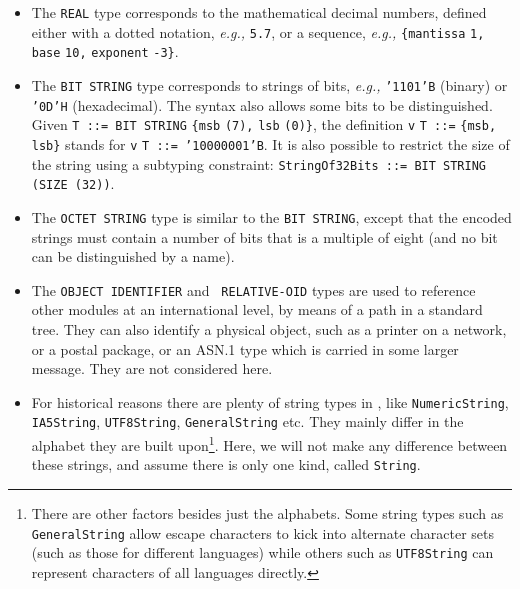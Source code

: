 \begin{itemize}
  \item The \texttt{\small REAL} type corresponds to the mathematical
        decimal numbers, defined either with a dotted notation,
        \emph{e.g.,} \texttt{\small 5.7}, or a sequence,
        \emph{e.g.,} \verb+{+\texttt{mantissa} \texttt{\small 1,}
        \texttt{base} \texttt{10}\texttt{\small,} \texttt{exponent}
        \texttt{\small -3}\verb+}+.

  \item The \texttt{\small BIT STRING} type corresponds to strings of
    bits, \emph{e.g.,} \texttt{\small '1101'B} (binary) or
    \texttt{\small '0D'H} (hexadecimal). The syntax also allows some
    bits to be distinguished. Given \texttt{\small T ::= BIT STRING}
    \verb+{+\texttt{msb} \texttt{\small (7),} \texttt{lsb}
    \texttt{\small (0)}\verb+}+, the definition \texttt{v}
    \texttt{\small T ::=} \verb+{+\texttt{msb}\texttt{\small ,}
    \texttt{lsb}\verb+}+ stands for \texttt{v} \texttt{\small T ::=
      '10000001'B}.  It is also possible to restrict the size of the
    string using a subtyping constraint: \texttt{StringOf32Bits ::=
      BIT STRING (SIZE (32))}.

  \item The \texttt{\small OCTET STRING} type is similar to the
        \texttt{\small BIT STRING}, except that the encoded strings
        must contain a number of bits that is a multiple of eight (and
        no bit can be distinguished by a name).

  \item The \texttt{\small OBJECT IDENTIFIER} and \texttt{\small
        RELATIVE-OID} types are used to reference other \ASN
        modules at an international level, by means of a path in a
        standard tree. They can also identify a physical object, such
        as a printer on a network, or a postal package, or an ASN.1
        type which is carried in some larger message. They are not
        considered here.

  \item For historical reasons there are plenty of string types in
        \ASN, like \texttt{Nu\-mer\-ic\-String}, \texttt{IA5String},
        \texttt{UTF8String}, \texttt{GeneralString} etc. They mainly
        differ in the alphabet they are built upon\footnote{There are
        other factors besides just the alphabets. Some string types
        such as \texttt{Ge\-ne\-ral\-String} allow escape characters
        to kick into alternate character sets (such as those for
        different languages) while others such as \texttt{UTF8String}
        can represent characters of all languages directly.}. Here, we
        will not make any difference between these strings,
        and assume there is only one kind, called \texttt{String}.

\end{itemize}

